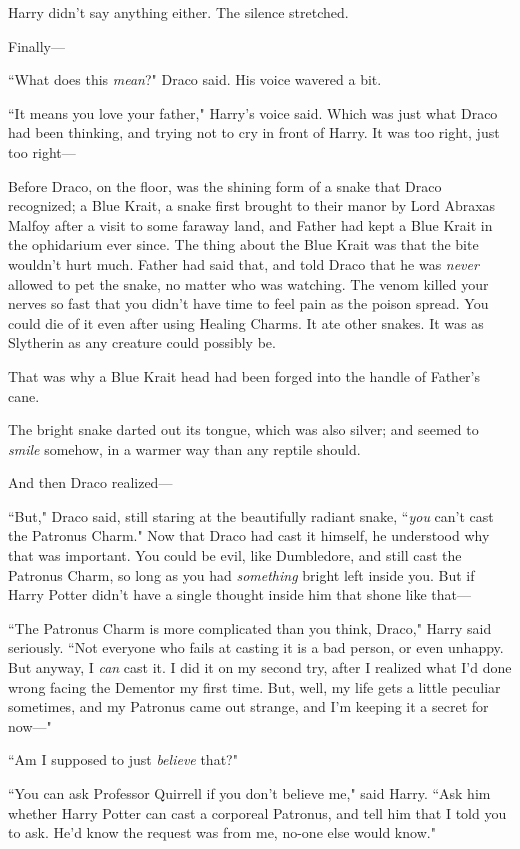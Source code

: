 Harry didn't say anything either. The silence stretched.

Finally—

``What does this \emph{mean}?" Draco said. His voice wavered a bit.

``It means you love your father," Harry's voice said. Which was just what Draco had been thinking, and trying not to cry in front of Harry. It was too right, just too right—

Before Draco, on the floor, was the shining form of a snake that Draco recognized; a Blue Krait, a snake first brought to their manor by Lord Abraxas Malfoy after a visit to some faraway land, and Father had kept a Blue Krait in the ophidarium ever since. The thing about the Blue Krait was that the bite wouldn't hurt much. Father had said that, and told Draco that he was \emph{never} allowed to pet the snake, no matter who was watching. The venom killed your nerves so fast that you didn't have time to feel pain as the poison spread. You could die of it even after using Healing Charms. It ate other snakes. It was as Slytherin as any creature could possibly be.

That was why a Blue Krait head had been forged into the handle of Father's cane.

The bright snake darted out its tongue, which was also silver; and seemed to \emph{smile} somehow, in a warmer way than any reptile should.

And then Draco realized—

``But," Draco said, still staring at the beautifully radiant snake, ``\emph{you} can't cast the Patronus Charm." Now that Draco had cast it himself, he understood why that was important. You could be evil, like Dumbledore, and still cast the Patronus Charm, so long as you had \emph{something} bright left inside you. But if Harry Potter didn't have a single thought inside him that shone like that—

``The Patronus Charm is more complicated than you think, Draco," Harry said seriously. ``Not everyone who fails at casting it is a bad person, or even unhappy. But anyway, I \emph{can} cast it. I did it on my second try, after I realized what I'd done wrong facing the Dementor my first time. But, well, my life gets a little peculiar sometimes, and my Patronus came out strange, and I'm keeping it a secret for now—"

``Am I supposed to just \emph{believe} that?"

``You can ask Professor Quirrell if you don't believe me," said Harry. ``Ask him whether Harry Potter can cast a corporeal Patronus, and tell him that I told you to ask. He'd know the request was from me, no-one else would know."

